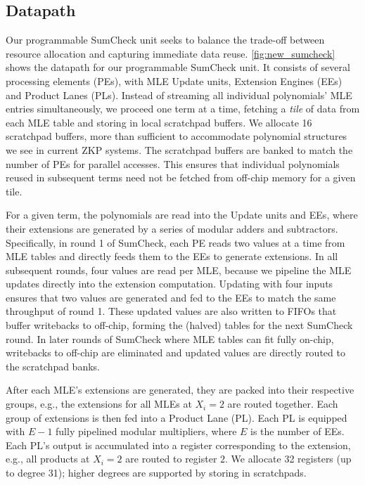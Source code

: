 \subsection{Datapath}
Our programmable SumCheck unit seeks to balance the trade-off between resource allocation and capturing immediate data reuse.
\autoref{fig:new_sumcheck}
shows the datapath 
for our programmable SumCheck unit. 
It consists of several processing elements (PEs), with MLE Update units, Extension Engines (EEs) and Product Lanes (PLs).
Instead of streaming all individual polynomials' MLE entries simultaneously, we proceed one term at a time, fetching a \textit{tile} of data from each MLE table and storing in local scratchpad buffers.
We allocate 16 scratchpad buffers, more than sufficient to accommodate polynomial structures we see in current ZKP systems.
The scratchpad buffers are banked to match the number of PEs for parallel accesses.
This ensures that individual polynomials reused in subsequent terms need not be fetched from off-chip memory for a given tile.

For a given term, the polynomials are read into the Update units and EEs, where their extensions are generated by a series of modular adders and subtractors.
Specifically, in round 1 of SumCheck, each PE reads two values at a time from MLE tables and directly feeds them to the EEs to generate extensions.
In all subsequent rounds, four values are read per MLE, because we pipeline the MLE updates directly into the extension computation.
Updating with four inputs ensures that two values are generated and fed to the EEs to match the 
same
throughput of round 1.
These updated values are also written to FIFOs that buffer writebacks to off-chip, forming the (halved) tables for the next SumCheck round.
In later rounds of SumCheck where MLE tables can fit fully on-chip, writebacks to off-chip are eliminated and updated values are directly routed to the scratchpad banks.

After each MLE's extensions are generated, they are packed into their respective groups, e.g., the extensions for all MLEs at $X_i = 2$ are routed together.
Each group of extensions is then fed into a Product Lane (PL).
Each PL is equipped with $E - 1$ fully pipelined modular multipliers, where $E$ is the number of EEs.
Each PL's output is accumulated into a register corresponding to the extension, e.g., all products at $X_i = 2$ are routed to register $2$.
We allocate 32 registers (up to degree 31); higher degrees are supported by storing in scratchpads.

